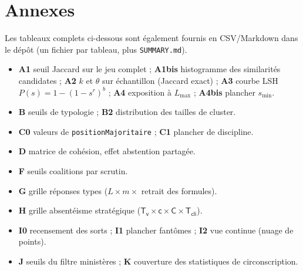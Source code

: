 \documentclass[11pt,a4paper]{article}
\newcommand{\code}[1]{\texttt{\small #1}}
\newcommand{\param}[1]{\ensuremath{\mathsf{#1}}}
\begin{document}
\section{Annexes}\label{sec:annexes}
Les tableaux complets ci-dessous sont également fournis en CSV/Markdown dans le
dépôt (un fichier par tableau, plus \code{SUMMARY.md}).
\begin{itemize}\small
  \item \textbf{A1} seuil Jaccard sur le jeu complet ; \textbf{A1bis} histogramme
        des similarités candidates ; \textbf{A2} $k$ et $\theta$ sur échantillon
        (Jaccard exact) ; \textbf{A3} courbe LSH $P(s)=1-(1-s^r)^b$ ; \textbf{A4}
        exposition à $L_{\max}$ ; \textbf{A4bis} plancher $s_{\min}$.
  \item \textbf{B} seuils de typologie ; \textbf{B2} distribution des tailles de
        cluster.
  \item \textbf{C0} valeurs de \code{positionMajoritaire} ; \textbf{C1} plancher de
        discipline.
  \item \textbf{D} matrice de cohésion, effet \og{}abstention partagée\fg{}.
  \item \textbf{F} seuils \og{}coalitions par scrutin\fg{}.
  \item \textbf{G} grille \og{}réponses types\fg{} ($L\times m\times$ retrait des
        formules).
  \item \textbf{H} grille \og{}absentéisme stratégique\fg{} ($\param{T_v}\times\param{c}\times\param{C}\times\param{T_{cli}}$).
  \item \textbf{I0} recensement des sorts ; \textbf{I1} plancher fantômes ;
        \textbf{I2} vue continue (nuage de points).
  \item \textbf{J} seuils du filtre ministères ; \textbf{K} couverture des
        statistiques de circonscription.
\end{itemize}

\end{document}
